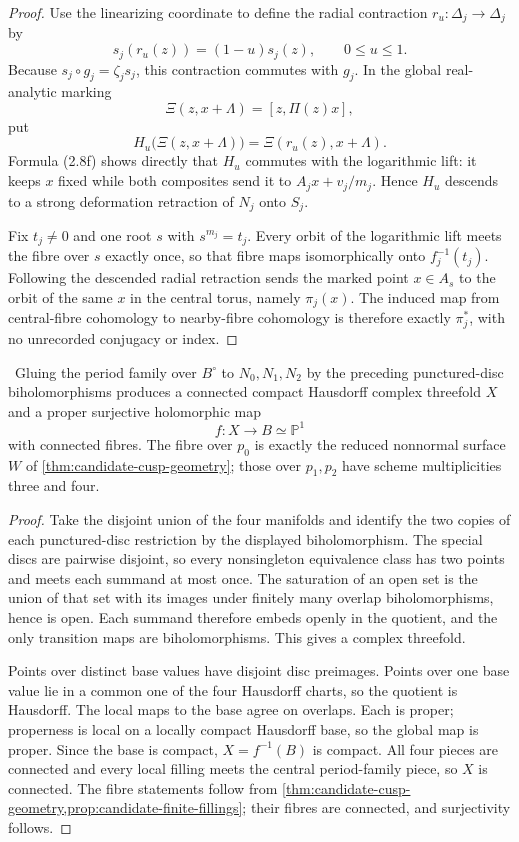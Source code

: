 \begin{proof}
Use the linearizing coordinate to define the radial contraction
\(r_u:\Delta_j\to\Delta_j\) by
\[
 s_j(r_u(z))=(1-u)s_j(z),\qquad 0\le u\le1.
\]
Because \(s_j\circ g_j=\zeta_js_j\), this contraction commutes with
\(g_j\).  In the global real-analytic marking
\[
 \Xi(z,x+\Lambda)=[z,\Pi(z)x],
\]
put
\[
 H_u\bigl(\Xi(z,x+\Lambda)\bigr)
   =\Xi(r_u(z),x+\Lambda).
\]
Formula (2.8f) shows directly that \(H_u\) commutes with the logarithmic
lift: it keeps \(x\) fixed while both composites send it to
\(A_jx+v_j/m_j\).  Hence \(H_u\) descends to a strong deformation
retraction of \(N_j\) onto \(S_j\).

Fix \(t_j\ne0\) and one root \(s\) with \(s^{m_j}=t_j\).  Every orbit of
the logarithmic lift meets the fibre over \(s\) exactly once, so that fibre
maps isomorphically onto \(f_j^{-1}(t_j)\).  Following the descended radial
retraction sends the marked point \(x\in A_s\) to the orbit of the same
\(x\) in the central torus, namely \(\pi_j(x)\).  The induced map from
central-fibre cohomology to nearby-fibre cohomology is therefore exactly
\(\pi_j^*\), with no unrecorded conjugacy or index.
\end{proof}

\begin{theorem}
\label{thm:candidate-global-geometry}
\Verified\ Gluing the period family over \(B^\circ\) to
\(N_0,N_1,N_2\) by the preceding punctured-disc biholomorphisms produces a
connected compact Hausdorff complex threefold \(X\) and a proper surjective
holomorphic map
\[
 f:X\longrightarrow B\simeq\mathbb P^1
\]
with connected fibres.  The fibre over \(p_0\) is exactly the reduced
nonnormal surface \(W\) of \cref{thm:candidate-cusp-geometry}; those over
\(p_1,p_2\) have scheme multiplicities three and four.
\end{theorem}

\begin{proof}
Take the disjoint union of the four manifolds and identify the two copies of
each punctured-disc restriction by the displayed biholomorphism.  The special
discs are pairwise disjoint, so every nonsingleton equivalence class has two
points and meets each summand at most once.  The saturation of an open set is
the union of that set with its images under finitely many overlap
biholomorphisms, hence is open.  Each summand therefore embeds openly in the
quotient, and the only transition maps are biholomorphisms.  This gives a
complex threefold.

Points over distinct base values have disjoint disc preimages.  Points over
one base value lie in a common one of the four Hausdorff charts, so the
quotient is Hausdorff.  The local maps to the base agree on overlaps.  Each
is proper; properness is local on a locally compact Hausdorff base, so the
global map is proper.  Since the base is compact, \(X=f^{-1}(B)\) is compact.
All four pieces are connected and every local filling meets the central
period-family piece, so \(X\) is connected.  The fibre statements follow
from \cref{thm:candidate-cusp-geometry,prop:candidate-finite-fillings}; their
fibres are connected, and surjectivity follows.
\end{proof}

